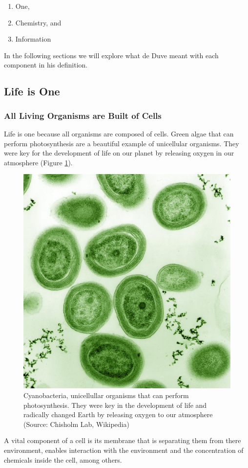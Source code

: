 \documentclass[
  11pt,
]{book}
\providecommand{\tightlist}{%
  \setlength{\itemsep}{0pt}\setlength{\parskip}{0pt}}
\begin{document}
\begin{enumerate}
\def\labelenumi{\arabic{enumi}.}
\tightlist
\item
  One,
\item
  Chemistry, and
\item
  Information
\end{enumerate}

In the following sections we will explore what de Duve meant with each component in his definition.

\hypertarget{life-is-one}{%
\subsection{Life is One}\label{life-is-one}}

\hypertarget{all-living-organisms-are-built-of-cells}{%
\subsubsection{All Living Organisms are Built of Cells}\label{all-living-organisms-are-built-of-cells}}

Life is one because all organisms are composed of cells.
Green algae that can perform photosynthesis are a beautiful example of unicellular organisms. They were key for the development of life on our planet by releasing oxygen in our atmosphere (Figure \ref{fig:greenAlgae}).

\begin{figure}

{\centering \includegraphics[width=0.3\linewidth]{./figs/Prochlorococcus_marinus} 

}

\caption{Cyanobacteria, unicellullar organisms that can perform photosynthesis. They were key in the development of life and radically changed Earth by releasing oxygen to our atmosphere (Source: Chisholm Lab, Wikipedia)}\label{fig:greenAlgae}
\end{figure}

A vital component of a cell is its membrane that is separating them from there environment, enables interaction with the environment and the concentration of chemicals inside the cell, among others.
\end{document}
